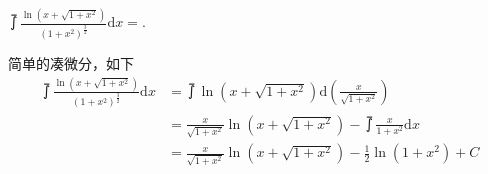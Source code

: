 \documentclass[hideanswer=false,
	enfont=newtxtext,
	zhfont=empty,
	mathfont=newtxmath,
]{cmcthesis}
\begin{document}
\wq $\upint{\frac{\ln\left(x+\sqrt{1+x^2}\right)}{\left(1+x^2\right)^{\frac{3}{2}}}}\mathrm{d}x=$\underline{\hspace{3em}}.\\
	\begin{answer}
	\begin{solution}
简单的凑微分，如下
\begin{align*}
\upint{\frac{\ln\left(x+\sqrt{1+x^2}\right)}{\left(1+x^2\right)^{\frac{3}{2}}}}\mathrm{d}x&=\upint{\ln\left(x+\sqrt{1+x^2}\right)}\mathrm{d}\left(\frac{x}{\sqrt{1+x^2}}\right)\\
&=\frac{x}{\sqrt{1+x^2}}\ln\left(x+\sqrt{1+x^2}\right)-\upint{\frac{x}{1+x^2}\mathrm{d}x}\\
&=\frac{x}{\sqrt{1+x^2}}\ln\left(x+\sqrt{1+x^2}\right)-\frac{1}{2}\ln\left(1+x^2\right)+C
\end{align*}
	\end{solution}
	\end{answer}
\end{document}
